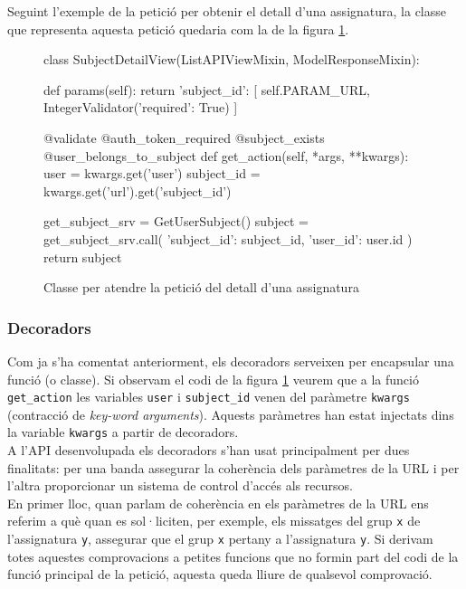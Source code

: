 Seguint l'exemple de la petició per obtenir el detall d'una assignatura,  la classe que representa aquesta petició quedaria com la de la figura \ref{fig:subject_detail_class}.

\begin{figure}[h!]
	\begin{python}
class SubjectDetailView(ListAPIViewMixin, ModelResponseMixin):

	def params(self):
		return {
			'subject_id': [
				self.PARAM_URL, 
				IntegerValidator({'required': True})
			]
		}
		
	@validate
	@auth_token_required
	@subject_exists
	@user_belongs_to_subject
	def get_action(self, *args, **kwargs):
		user = kwargs.get('user')
		subject_id = kwargs.get('url').get('subject_id')
		
		get_subject_srv = GetUserSubject()
		subject = get_subject_srv.call({
			'subject_id': subject_id, 
			'user_id': user.id
		})
		return subject
	\end{python}
	\caption{Classe per atendre la petició del detall d'una assignatura}
	\label{fig:subject_detail_class}
\end{figure}

\subsubsection{Decoradors}

Com ja s'ha comentat anteriorment, els decoradors serveixen per encapsular una funció (o classe). Si observam el codi de la figura \ref{fig:subject_detail_class} veurem que a la funció \texttt{get\_action} les variables \texttt{user} i \texttt{subject\_id} venen del paràmetre \texttt{kwargs} (contracció de \emph{key-word arguments}). Aquests paràmetres han estat injectats dins la variable \texttt{kwargs} a partir de decoradors.\\

A l'\ac{API} desenvolupada els decoradors s'han usat principalment per dues finalitats: per una banda assegurar la coherència dels paràmetres de la \ac{URL} i per l'altra proporcionar un sistema de control d'accés als recursos. \\

En primer lloc, quan parlam de coherència en els paràmetres de la \ac{URL} ens referim a què quan es sol·liciten, per exemple,  els missatges del grup \texttt{x} de l'assignatura \texttt{y}, assegurar que el grup \texttt{x} pertany a l'assignatura \texttt{y}. Si derivam totes aquestes comprovacions a petites funcions que no formin part del codi de la funció principal de la petició, aquesta queda lliure de qualsevol comprovació.\\

